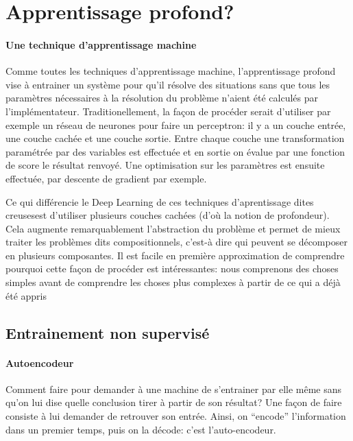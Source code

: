 \documentclass[a4paper,11pt]{article}
\begin{document}
\section{Apprentissage profond?}

\paragraph{Une technique d'apprentissage machine}

Comme toutes les techniques d'apprentissage machine, l'apprentissage profond
vise à entrainer un système pour qu'il résolve des situations sans que tous les
paramètres nécessaires à la résolution du problème n'aient été calculés par
l'implémentateur. Traditionellement, la façon de procéder serait d'utiliser par
exemple un réseau de neurones pour faire un perceptron: il y a un couche entrée,
une couche cachée et une couche sortie. Entre chaque couche une transformation
paramétrée par des variables est effectuée et en sortie on évalue par une
fonction de score le résultat renvoyé. Une optimisation sur les paramètres est
ensuite effectuée, par descente de gradient par exemple.

Ce qui différencie le Deep Learning de ces techniques d'aprentissage dites \og
creuses\fg est d'utiliser plusieurs couches cachées (d'où la notion de
profondeur). Cela augmente remarquablement l'abstraction du problème et permet
de mieux traiter les problèmes dits compositionnels, c'est-à dire qui peuvent se
décomposer en plusieurs composantes. Il est facile en première approximation de
comprendre pourquoi cette façon de procéder est intéressantes: nous comprenons
des choses simples avant de comprendre les choses plus complexes à partir de ce
qui a déjà été appris

\subsection{Entrainement non supervisé}

\paragraph{Autoencodeur}

Comment faire pour demander à une machine de s'entrainer par elle même sans
qu'on lui dise quelle conclusion tirer à partir de son résultat? Une façon de
faire consiste à lui demander de retrouver son entrée. Ainsi, on ``encode''
l'information dans un premier temps, puis on la décode: c'est l'auto-encodeur.
\end{document}
